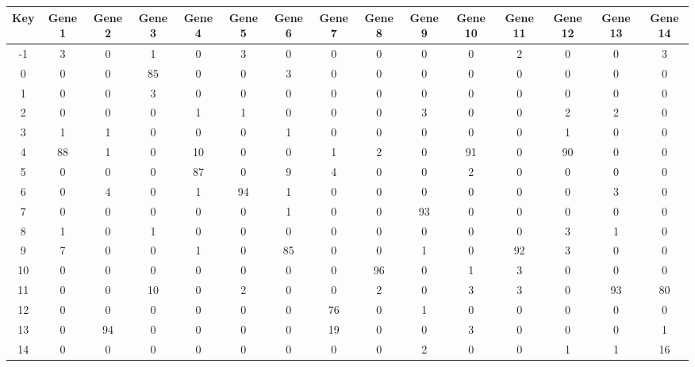 \begin{tabular}{|c|c|c|c|c|c|c|c|c|c|c|c|c|c|c|}
\hline
Key & Gene 1 & Gene 2 & Gene 3 & Gene 4 & Gene 5 & Gene 6 & Gene 7 & Gene 8 & Gene 9 & Gene 10 & Gene 11 & Gene 12 & Gene 13 & Gene 14 \\
\hline
-1 & 3 & 0 & 1 & 0 & 3 & 0 & 0 & 0 & 0 & 0 & 2 & 0 & 0 & 3 \\
0 & 0 & 0 & 85 & 0 & 0 & 3 & 0 & 0 & 0 & 0 & 0 & 0 & 0 & 0 \\
1 & 0 & 0 & 3 & 0 & 0 & 0 & 0 & 0 & 0 & 0 & 0 & 0 & 0 & 0 \\
2 & 0 & 0 & 0 & 1 & 1 & 0 & 0 & 0 & 3 & 0 & 0 & 2 & 2 & 0 \\
3 & 1 & 1 & 0 & 0 & 0 & 1 & 0 & 0 & 0 & 0 & 0 & 1 & 0 & 0 \\
4 & 88 & 1 & 0 & 10 & 0 & 0 & 1 & 2 & 0 & 91 & 0 & 90 & 0 & 0 \\
5 & 0 & 0 & 0 & 87 & 0 & 9 & 4 & 0 & 0 & 2 & 0 & 0 & 0 & 0 \\
6 & 0 & 4 & 0 & 1 & 94 & 1 & 0 & 0 & 0 & 0 & 0 & 0 & 3 & 0 \\
7 & 0 & 0 & 0 & 0 & 0 & 1 & 0 & 0 & 93 & 0 & 0 & 0 & 0 & 0 \\
8 & 1 & 0 & 1 & 0 & 0 & 0 & 0 & 0 & 0 & 0 & 0 & 3 & 1 & 0 \\
9 & 7 & 0 & 0 & 1 & 0 & 85 & 0 & 0 & 1 & 0 & 92 & 3 & 0 & 0 \\
10 & 0 & 0 & 0 & 0 & 0 & 0 & 0 & 96 & 0 & 1 & 3 & 0 & 0 & 0 \\
11 & 0 & 0 & 10 & 0 & 2 & 0 & 0 & 2 & 0 & 3 & 3 & 0 & 93 & 80 \\
12 & 0 & 0 & 0 & 0 & 0 & 0 & 76 & 0 & 1 & 0 & 0 & 0 & 0 & 0 \\
13 & 0 & 94 & 0 & 0 & 0 & 0 & 19 & 0 & 0 & 3 & 0 & 0 & 0 & 1 \\
14 & 0 & 0 & 0 & 0 & 0 & 0 & 0 & 0 & 2 & 0 & 0 & 1 & 1 & 16 \\
\hline
\end{tabular}